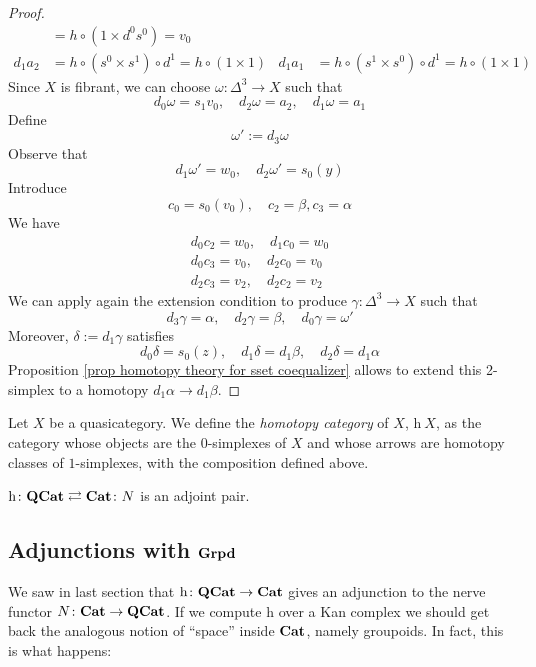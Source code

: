 \begin{refsection}
\begin{proof}
\begin{align*}
& = h \circ (1 \times d^0 s^0) = v_0 \\
d_1 a_2 & = h \circ (s^0 \times s^1) \circ d^1 = h \circ (1 \times 1) & d_1 a_1 & = h \circ (s^1 \times s^0) \circ d^1 = h \circ (1 \times 1)
\end{align*}
Since $X$ is fibrant, we can choose $\omega \colon \Delta^3 \to X$ such that
\[
d_0 \omega = s_1 v_0, \quad d_2 \omega = a_2, \quad d_1 \omega = a_1
\]
Define
\[
\omega' := d_3 \omega
\]
Observe that
\[
d_1 \omega' = w_0, \quad d_2 \omega' = s_0(y)
\]
Introduce
\[
c_0 = s_0(v_0), \quad c_2 = \beta, c_3 = \alpha
\]
We have
\begin{gather*}
d_0 c_2 = w_0, \quad d_1 c_0 = w_0 \\
d_0 c_3 = v_0, \quad d_2 c_0 = v_0 \\
d_2 c_3 = v_2, \quad d_2 c_2 = v_2
\end{gather*}
We can apply again the extension condition to produce $\gamma \colon \Delta^3 \to X$ such that
\[
d_3 \gamma = \alpha, \quad d_2 \gamma = \beta, \quad d_0 \gamma = \omega'
\]
Moreover, $\delta := d_1 \gamma$ satisfies
\[
d_0 \delta = s_0(z), \quad d_1 \delta = d_1 \beta, \quad d_2 \delta = d_1 \alpha
\]
Proposition \ref{prop homotopy theory for sset coequalizer} allows to extend this 2-simplex to a homotopy $d_1 \alpha \to d_1 \beta$.
\end{proof}

\begin{defin}
Let $X$ be a quasicategory. We define the \emph{homotopy category} of $X$, $\mathrm h \: X$, as the category whose objects are the $0$-simplexes of $X$ and whose arrows are homotopy classes of $1$-simplexes, with the composition defined above.
\end{defin}

\begin{thm} \label{thm nerve adjunction 1}
$\mathrm h \colon \mathbf{QCat} \rightleftarrows \mathbf{Cat} \colon N$ is an adjoint pair.
\end{thm}

\subsection{Adjunctions with $\mathbf{Grpd}$}

We saw in last section that $\mathrm h \colon \mathbf{QCat} \to \mathbf{Cat}$ gives an adjunction to the nerve functor $N \colon \mathbf{Cat} \to \mathbf{QCat}$. If we compute $\mathrm h$ over a Kan complex we should get back the analogous notion of ``space'' inside $\mathbf{Cat}$, namely groupoids. In fact, this is what happens:


\end{refsection}
